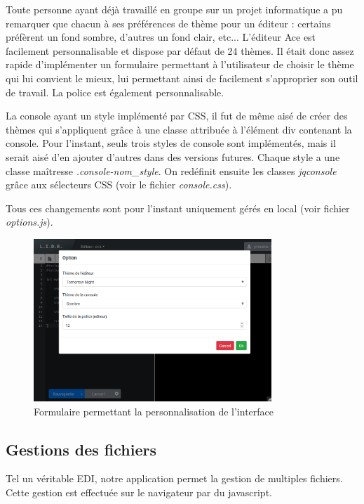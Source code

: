 \par Toute personne ayant déjà travaillé en groupe sur un projet informatique a pu remarquer que chacun à ses préférences de thème pour un éditeur : certains préfèrent un fond sombre, d'autres un fond clair, etc... L'éditeur Ace est facilement personnalisable et dispose par défaut de 24 thèmes. Il était donc assez rapide d'implémenter un formulaire permettant à l'utilisateur de choisir le thème qui lui convient le mieux, lui permettant ainsi de facilement s'approprier son outil de travail. La police est également personnalisable.

La console ayant un style implémenté par CSS, il fut de même aisé de créer des thèmes qui s'appliquent grâce à une classe attribuée à l'élément div contenant la console. Pour l'instant, seuls trois styles de console sont implémentés, mais il serait aisé d'en ajouter d'autres dans des versions futures. Chaque style a une classe maîtresse \emph{.console-nom\_style}. On redéfinit ensuite les classes \emph{jqconsole} grâce aux sélecteurs CSS (voir le fichier \emph{console.css}).

Tous ces changements sont pour l'instant uniquement gérés en local (voir fichier \emph{options.js}).

\begin{figure}[!h]
\centering
\includegraphics[width=0.8\textwidth]{./img/frontend/example_personnalisation.png}
\caption{Formulaire permettant la personnalisation de l'interface}
\end{figure}

\subsection{Gestions des fichiers}
Tel un véritable EDI, notre application permet la gestion de multiples fichiers. Cette gestion est effectuée sur le navigateur par du javascript.

